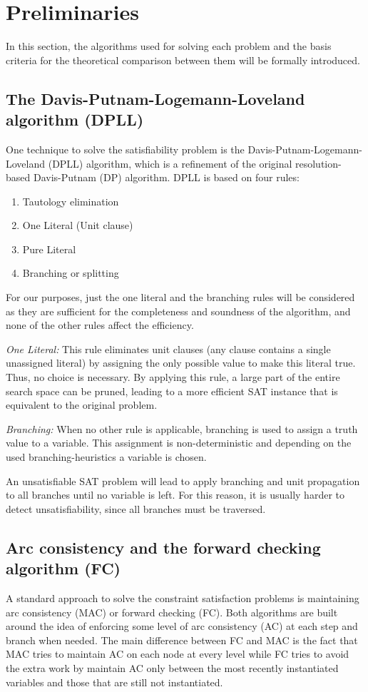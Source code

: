 \section{Preliminaries}\label{sec:prelim}
In this section, the algorithms used for solving each problem and the basis criteria for the theoretical comparison between them will be formally introduced. 

\subsection{The Davis-Putnam-Logemann-Loveland algorithm (DPLL)}
One technique to solve the satisfiability problem is the Davis-Putnam-Logemann-Loveland (DPLL) algorithm, which is a refinement of the original resolution-based Davis-Putnam (DP) algorithm. DPLL is based on four rules:
\begin{enumerate}
	\item Tautology elimination
	\item One Literal (Unit clause)
	\item Pure Literal
	\item Branching or splitting
\end{enumerate}
For our purposes, just the one literal and the branching rules will be considered as they are sufficient for the completeness and soundness of the algorithm, and none of the other rules affect the efficiency.

\textit{One Literal:} This rule eliminates unit clauses (any clause contains a single unassigned literal) by assigning the only possible value to make this literal true. Thus, no choice is necessary. By applying this rule, a large part of the entire search space can be pruned, leading to a more efficient SAT instance that is equivalent to the original problem.

\textit{Branching:} When no other rule is applicable, branching is used to assign a truth value to a variable. This assignment is non-deterministic and depending on the used branching-heuristics a variable is chosen. 

An unsatisfiable SAT problem will lead to apply branching and unit propagation to all branches until no variable is left. For this reason, it is usually harder to detect unsatisfiability, since all branches must be traversed.

\subsection{Arc consistency and the forward checking algorithm (FC)}
A standard approach to solve the constraint satisfaction problems is maintaining arc consistency (MAC) or forward checking (FC). Both algorithms are built around the idea of enforcing some level of arc consistency (AC) at each step and branch when needed. The main difference between FC and MAC is the fact that MAC tries to maintain AC on each node at every level while FC tries to avoid the extra work by maintain AC only between the most recently instantiated variables and those that are still not instantiated.

